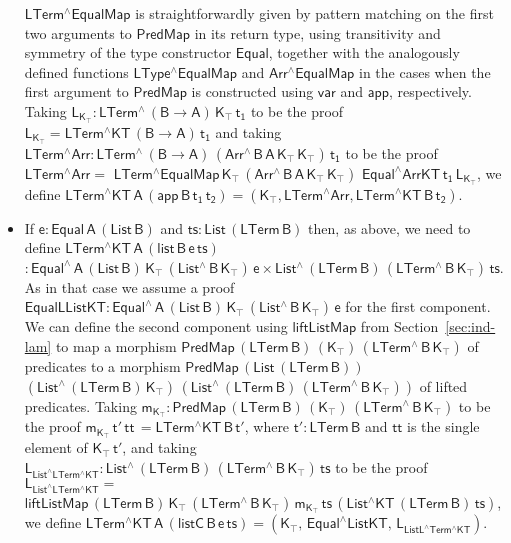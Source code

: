 \documentclass[9pt]{entcs}
\begin{document}
\begin{itemize}
  $\mathsf{LTerm^\wedge EqualMap}$ is straightforwardly given by
  pattern matching on the first two arguments to $\mathsf{PredMap}$ in
  its return type, using transitivity and symmetry of the type
  constructor $\mathsf{Equal}$, together with the analogously defined
  functions $\mathsf{LType^\wedge EqualMap}$ and $\mathsf{Arr^\wedge
    EqualMap}$ in the cases when the first argument to
  $\mathsf{PredMap}$ is constructed using $\mathsf{var}$ and
  $\mathsf{app}$, respectively. Taking $\mathsf{L_{K_\top} :
    LTerm^{\wedge}\, (B \to A) \, K_\top\, t_1}$ to be the proof
  $\mathsf{L_{K_\top} = LTerm^\wedge KT\, (B \to A)\, t_1}$ and taking
  $\mathsf{ LTerm^\wedge Arr : LTerm^{\wedge}\, (B \to A)\,
    (Arr^{\wedge} \, B\, A\, K_\top \, K_\top)\, t_1}$ to be the proof
  $\mathsf{LTerm^\wedge Arr =}$ $\mathsf{LTerm^\wedge
    EqualMap\,K_\top\,(Arr^{\wedge}\,B\,A\,K_\top\,K_\top)\,\,
    Equal^\wedge ArrKT\, t_1\, L_{K_\top}}$, we define
  $\mathsf{LTerm^\wedge KT\,A\, (app\, B\, t_1\, t_2) = (K_\top ,
    LTerm^\wedge Arr , LTerm^\wedge KT\,B\,t_2)}$.
\item If $\mathsf{e : Equal\,A\,(List\,B)}$ and $\mathsf{ts :
  List\,(LTerm\, B)}$ then, as above, we need to define
  $\mathsf{LTerm^\wedge KT\,A\, (list\, B \,e\, ts)}$ $\mathsf{:
  Equal^{\wedge} \, A\, (List\,B)\, K_\top\, (List^{\wedge} \, B\,
  K_\top) \, e \times List^{\wedge}\, (LTerm\,B) \, (LTerm^{\wedge} \,
  B\, K_\top) \, ts }$.  As in that case we assume a proof
  $\mathsf{EqualLListKT : Equal^{\wedge} \, A\, (List\,B)\, K_\top\,
  (List^{\wedge} \, B\, K_\top) \, e}$ for the first component.  We
  can define the second component using $\mathsf{liftListMap}$ from
  Section~\ref{sec:ind-lam} to map a morphism $\mathsf{PredMap\,
    (LTerm\,B)\, (K_\top)\, (LTerm^{\wedge}\,B\,K_\top)}$ of
  predicates to a morphism $\mathsf{PredMap\,(List\,(LTerm\,B))}$
  $\mathsf{(List^{\wedge}\,(LTerm\,B)\,K_\top) \,
    (List^{\wedge}\,(LTerm\,B)\, (LTerm^{\wedge}\,B\,K_\top))}$ of
  lifted predicates.  Taking $\mathsf{m_{K_\top} : PredMap\,
    (LTerm\,B) \, (K_\top)\, (LTerm^{\wedge}\,B\,K_\top)}$ to be the
  proof $\mathsf{m_{K_\top} \, t'\, tt\, = LTerm^\wedge KT\, B\, t'}$,
  where $\mathsf{t' : LTerm\,B}$ and $\mathsf{tt}$ is the single
  element of $\mathsf{K_\top\, t'}$, and taking
  $\mathsf{L_{List^\wedge LTerm^\wedge KT} : List^{\wedge}\,
    (LTerm\,B) \, (LTerm^{\wedge} \, B\, K_\top) \, ts}$ to be the
  proof $\mathsf{ L_{List^\wedge LTerm^\wedge KT} =}$
  $\mathsf{liftListMap \, (LTerm\,B) \, K_\top \, (LTerm^{\wedge}\,
    B\, K_\top) \, m_{K_\top} \, ts \, (List^\wedge KT\, (LTerm\, B)\,
    ts) }$, we define $\mathsf{LTerm^\wedge KT\,A\, (listC\, B\, e\,
    ts) = (K_\top , \, Equal^\wedge ListKT , \, L_{ListL^\wedge
      Term^\wedge KT} ) }$.
\end{itemize}
\end{document}
